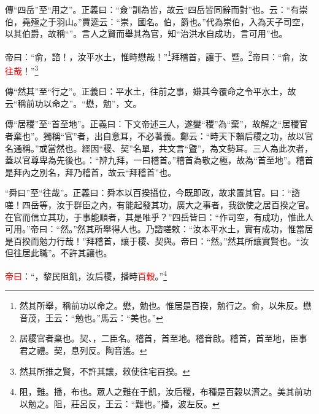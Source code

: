 {\noindent\zhuan{}\fzbyks 傳“四岳”至“用之”。正義曰：“僉”訓為皆，故云“四岳皆同辭而對”也。云：“有崇伯，堯殛之于羽山。”賈逵云：“崇，國名。伯，爵也。”代為崇伯，入為天子司空，以其伯爵，故稱“”。言人之賢而舉其為官，知“治洪水自成功，言可用”也。 \par}

帝曰：“俞，諮！，汝平水土，惟時懋哉！”\footnote{然其所舉，稱前功以命之。懋，勉也。惟居是百揆，勉行之。俞，以朱反。懋音茂，王云：“勉也。”馬云：“美也。”}拜稽首，讓于、暨。\footnote{居稷官者棄也。契、，二臣名。稽首，首至地。稽音啟。稽首，首至地，臣事君之禮。契，息列反。陶音遙。}帝曰：“俞，汝\textcolor{red}{往哉}！”\footnote{然其所推之賢，不許其讓，敕使往宅百揆。}

{\noindent\zhuan{}\fzbyks 傳“然其”至“行之”。正義曰：平水土，往前之事，嫌其今覆命之令平水土，故云“稱前功以命之”。“懋，勉”，文。 \par}

{\noindent\zhuan{}\fzbyks 傳“居稷”至“首至地”。正義曰：下文帝述三人，遂變“稷”為“棄”，故解之“居稷官者棄也”。獨稱“官”者，出自意耳，不必著義。鄭云：“時天下賴后稷之功，故以官名通稱。”或當然也。經因“稷、契”名單，共文言“暨”，為文勢耳。三人為此次者，蓋以官尊卑為先後也。：“辨九拜，一曰稽首。”稽首為敬之極，故為“首至地”。稽首是拜內之別名，拜乃稽首，故云“拜稽首”也。 \par}

{\noindent\shu{}\fzkt “舜曰”至“往哉”。正義曰：舜本以百揆攝位，今既即政，故求置其官。曰：“諮嗟！四岳等，汝于群臣之內，有能起發其功，廣大之事者，我欲使之居百揆之官。在官而信立其功，于事能順者，其是唯乎？”四岳皆曰：“作司空，有成功，惟此人可用。”帝曰：“然。”然其所舉得人也。乃諮嗟敕：“汝本平水土，實有成功，惟當居是百揆而勉力行哉！”拜稽首，讓于稷、契與。帝曰：“然。”然其所讓實賢也。“汝但往居此職”。不許其讓也。 \par}

\textcolor{red}{帝曰}：“，黎民阻飢，汝后稷，播時\textcolor{red}{百穀}。”\footnote{阻，難。播，布也。眾人之難在于飢，汝后稷，布種是百穀以濟之。美其前功以勉之。阻，莊呂反，王云：“難也。”播，波左反。}

